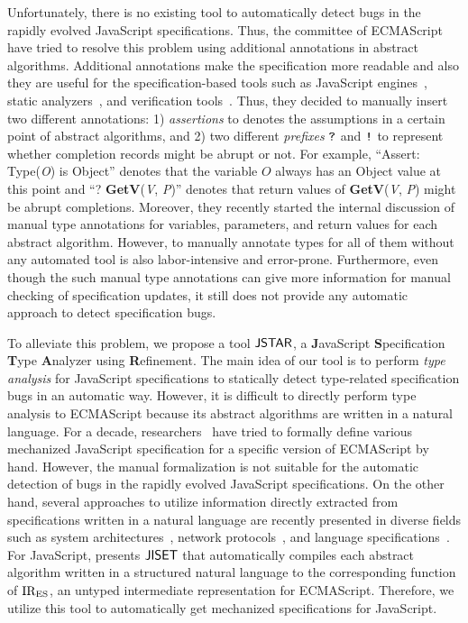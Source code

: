 Unfortunately, there is no existing tool to automatically detect bugs in the
rapidly evolved JavaScript specifications.  Thus, the committee of ECMAScript
have tried to resolve this problem using additional annotations in abstract
algorithms.  Additional annotations make the specification more readable and
also they are useful for the specification-based tools such as JavaScript
engines~\cite{v8, graaljs, qjs, moddable}, static analyzers~\cite{safe, tajs,
jsai, wala}, and verification tools~\cite{javert}.  Thus, they decided to
manually insert two different annotations: 1) \textit{assertions} to denotes the
assumptions in a certain point of abstract algorithms, and 2) two different
\textit{prefixes} $\texttt{?}$ and $\texttt{!}$ to represent whether completion
records might be abrupt or not.  For example, ``Assert: Type(\textit{O}) is
Object'' denotes that the variable $\textit{O}$ always has an Object value at
this point and ``? \textbf{GetV}(\textit{V}, \textit{P})'' denotes that return
values of \textbf{GetV}(\textit{V}, \textit{P}) might be abrupt completions.
Moreover, they recently started the internal discussion of manual type
annotations for variables, parameters, and return values for each abstract
algorithm.  However, to manually annotate types for all of them without any
automated tool is also labor-intensive and error-prone.  Furthermore, even
though the such manual type annotations can give more information for manual
checking of specification updates, it still does not provide any automatic
approach to detect specification bugs.

To alleviate this problem, we propose a tool $\textsf{JSTAR}$, a \textbf{J}avaScript
\textbf{S}pecification \textbf{T}ype \textbf{A}nalyzer using
\textbf{R}efinement.  The main idea of our tool is to perform \textit{type
analysis} for JavaScript specifications to statically detect type-related
specification bugs in an automatic way.  However, it is difficult to directly
perform type analysis to ECMAScript because its abstract algorithms are written
in a natural language.  For a decade, researchers~\cite{lambdajs, jscert, kjs}
have tried to formally define various mechanized JavaScript specification for a
specific version of ECMAScript by hand.  However, the manual formalization is
not suitable for the automatic detection of bugs in the rapidly evolved
JavaScript specifications.  On the other hand, several approaches to utilize
information directly extracted from specifications written in a natural language
are recently presented in diverse fields such as system architectures~\cite{x86,
arm}, network protocols~\cite{basespec}, and language
specifications~\cite{spectest}.  For JavaScript, \citet{jiset} presents $\textsf{JISET}$
that automatically compiles each abstract algorithm written in a structured
natural language to the corresponding function of ${\text{IR}_\text{ES}}$, an untyped
intermediate representation for ECMAScript.  Therefore, we utilize this tool to
automatically get mechanized specifications for JavaScript.

